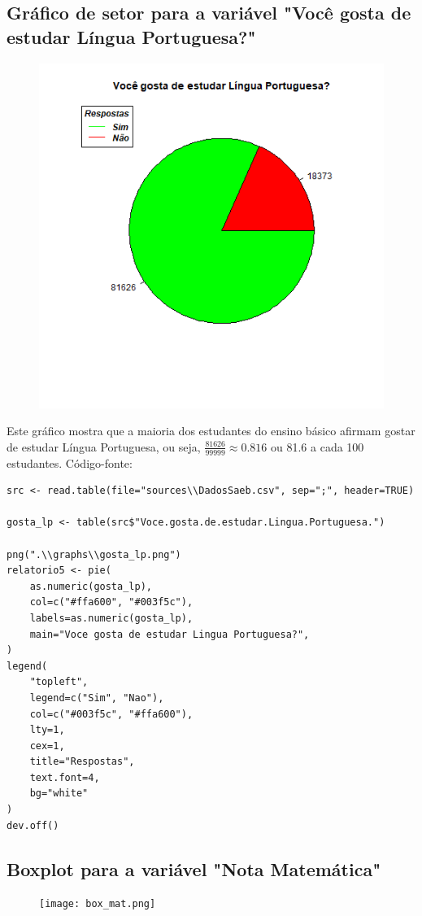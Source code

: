 \documentclass[17pt]{extarticle}
\begin{document}
\subsection{Gráfico de setor para a variável "Você gosta de estudar Língua Portuguesa?"}
\begin{figure}[H]
    \includegraphics[width=0.7\linewidth]{gosta_lp.png}
    \centering
\end{figure}
Este gráfico mostra que a maioria dos estudantes do ensino básico afirmam gostar de estudar Língua Portuguesa, ou seja, \(\frac{81626}{99999} \approx 0.816\) ou 81.6 a cada 100 estudantes. \newline
Código-fonte:
\begin{lstlisting}
src <- read.table(file="sources\\DadosSaeb.csv", sep=";", header=TRUE)

gosta_lp <- table(src$"Voce.gosta.de.estudar.Lingua.Portuguesa.")

png(".\\graphs\\gosta_lp.png")
relatorio5 <- pie(
    as.numeric(gosta_lp),
    col=c("#ffa600", "#003f5c"),
    labels=as.numeric(gosta_lp),
    main="Voce gosta de estudar Lingua Portuguesa?",
)
legend(
    "topleft",
    legend=c("Sim", "Nao"),
    col=c("#003f5c", "#ffa600"),
    lty=1,
    cex=1,
    title="Respostas",
    text.font=4,
    bg="white"
)
dev.off()
\end{lstlisting}

\subsection{Boxplot para a variável "Nota Matemática"}
\begin{figure}[H]
    \texttt{[image: box\_mat.png]}
    \centering
\end{figure}
\end{document}
